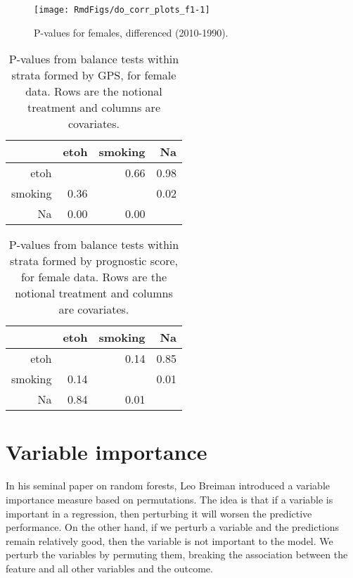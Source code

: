 \documentclass[11pt]{article}\usepackage[]{graphicx}\usepackage[]{color}
\makeatletter
\def\maxwidth{ %
  \ifdim\Gin@nat@width>\linewidth
    \linewidth
  \else
    \Gin@nat@width
  \fi
}
\newenvironment{knitrout}{}{} %
\makeatother
\begin{document}
\begin{knitrout}
\color{fgcolor}\begin{figure}
\texttt{[image: RmdFigs/do\_corr\_plots\_f1-1]} \caption[P-values for females, differenced (2010-1990)]{P-values for females, differenced (2010-1990).}\label{fig:do_corr_plots_f1}
\end{figure}


\end{knitrout}
\begin{table}[ht]
\centering
\begin{tabular}{r|rrr}
  \hline
 & etoh & smoking & Na \\ 
  \hline
etoh &  & 0.66 & 0.98 \\ 
  smoking & 0.36 &  & 0.02 \\ 
  Na & 0.00 & 0.00 &  \\ 
   \hline
\end{tabular}
\caption{P-values from balance tests within strata formed by GPS, for female data.
                    Rows are the notional treatment and columns are covariates.} 
\label{tab:gps_balance_f}
\end{table}
\begin{table}[ht]
\centering
\begin{tabular}{r|rrr}
  \hline
 & etoh & smoking & Na \\ 
  \hline
etoh &  & 0.14 & 0.85 \\ 
  smoking & 0.14 &  & 0.01 \\ 
  Na & 0.84 & 0.01 &  \\ 
   \hline
\end{tabular}
\caption{P-values from balance tests within strata formed by prognostic score, for female data.
                    Rows are the notional treatment and columns are covariates.} 
\label{tab:gps_balance_f}
\end{table}



\clearpage
\section{Variable importance}

In his seminal paper on random forests, Leo Breiman introduced a variable importance measure based on permutations. 
The idea is that if a variable is important in a regression, then perturbing it will worsen the predictive performance. 
On the other hand, if we perturb a variable and the predictions remain relatively good, then the variable is not important to the model. 
We perturb the variables by permuting them, breaking the association between the feature and all other variables and the outcome.
\end{document}
